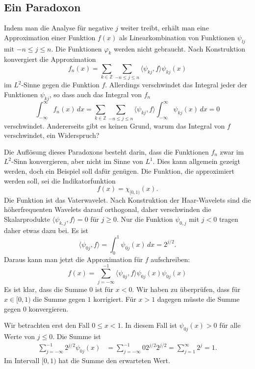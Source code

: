 \subsection{Ein Paradoxon}
Indem man die Analyse für negative $j$ weiter treibt, erhält man
eine Approximation einer Funktion $f(x)$ als Linearkombination von
Funktionen $\psi_{lj}$ mit $-n\le j\le n$.
Die Funktionen $\varphi_k$ werden nicht gebraucht.
Nach Konstruktion konvergiert die Approximation
\[
f_n(x)
=
\sum_{k\in\mathbb Z}\sum_{-n\le j\le n} \langle\psi_{kj},f\rangle \psi_{kj}(x)
\]
im $L^2$-Sinne gegen die Funktion $f$.
Allerdings verschwindet das Integral jeder der Funktionen $\psi_{kj}$,
so dass auch das Integral von $f_n$
\[
\int_{-\infty}^\infty f_n(x)\,dx
=
\sum_{k\in\mathbb Z}\sum_{-n\le j\le n} \langle\psi_{kj},f\rangle
\int_{-\infty}^\infty \psi_{kj}(x)\,dx
=
0
\]
verschwindet.
Andererseits gibt es keinen Grund, warum das Integral von $f$ verschwindet,
ein Widerspruch?

Die Auflösung dieses Paradoxons besteht darin, dass die Funktionen
$f_n$ zwar im $L^2$-Sinn konvergieren, aber nicht im Sinne von $L^1$.
Dies kann allgemein gezeigt werden, doch ein Beispiel soll dafür genügen.
Die Funktion, die approximiert werden soll, sei die Indikatorfunktion
\[
f(x) = \chi_{[0,1)}(x).
\]
Die Funktion ist das Vaterwavelet.
Nach Konstruktion der Haar-Wavelets sind die höherfrequenten Wavelets
darauf orthogonal, daher verschwinden die Skalarprodukte
$\langle \psi_{k,j},f\rangle=0$ für $j\ge 0$.
Nur die Funktion $\psi_{0,j}$ mit $j<0$ tragen daher etwas dazu bei.
Es ist
\[
\langle \psi_{0j},f\rangle
=
\int_0^1 \psi_{0j}(x)\,dx
=
2^{j/2}.
\]
Daraus kann man jetzt die Approximation für $f$ aufschreiben:
\[
f(x)
=
\sum_{j=-\infty}^{-1} \langle \psi_{0j},f\rangle \psi_{0j}(x)
\psi_{0j}(x)
\]
Es ist klar, dass die Summe $0$ ist für $x<0$.
Wir haben zu überprüfen, dass für $x\in[0,1)$ die Summe gegen $1$ 
korrigiert. 
Für $x>1$ dagegen müsste die Summe gegen $0$ konvergieren.

Wir betrachten erst den Fall $0\le x < 1$.
In diesem Fall ist $\psi_{0j}(x)>0$ für alle Werte von $j\le 0$.
Die Summe ist
\begin{align*}
\sum_{j=-\infty}^{-1} 2^{j/2} \psi_{0j}(x)
&=
\sum_{j=-\infty}^{-1}0 2^{j/2} 2^{j/2}
=
\sum_{j=1}^\infty 2^j = 1.
\end{align*}
Im Intervall $[0,1)$ hat die Summe den erwarteten Wert.

